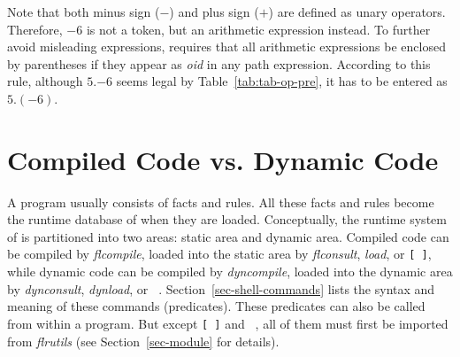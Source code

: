 \documentclass[11pt]{report}
\begin{document}
Note that both minus sign ($-$) and plus sign ($+$) are defined as unary operators. Therefore,
$-6$ is not a token, but an arithmetic expression instead. To further avoid misleading
expressions, \FLORA requires that all arithmetic expressions be enclosed by parentheses if
they appear as {\it oid} in any path expression. According to this rule, although $5.$$-6$
seems legal by Table~\ref{tab:tab-op-pre}, it has to be entered as $5.(-6)$.

\section{Compiled Code vs. Dynamic Code}

A \FLORA program usually consists of facts and rules. All these facts and rules become the
runtime database of \FLORA when they are loaded. Conceptually, the runtime system of \FLORA
is partitioned into two areas: static area and dynamic area. Compiled code can be compiled by
\emph{flcompile}, loaded into the static area by \emph{flconsult}, \emph{load}, or {\tt [~]},
while dynamic code can be compiled by \emph{dyncompile}, loaded into the dynamic area by
\emph{dynconsult}, \emph{dynload}, or \texttt{~}.
Section~\ref{sec-shell-commands} lists the syntax and meaning of these commands (predicates).
These predicates can also be called from within a \FLORA program. But except {\tt [~]} and
\texttt{~}, all of them must first be imported from \emph{flrutils}
(see Section~\ref{sec-module} for details).
\end{document}
